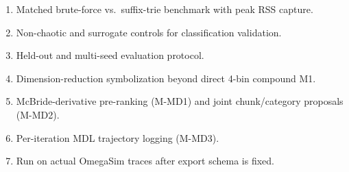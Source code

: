 \documentclass[11pt]{article}
\begin{document}
\begin{enumerate}
\item Matched brute-force vs.\ suffix-trie benchmark with peak RSS capture.
\item Non-chaotic and surrogate controls for classification validation.
\item Held-out and multi-seed evaluation protocol.
\item Dimension-reduction symbolization beyond direct 4-bin compound M1.
\item McBride-derivative pre-ranking (M-MD1) and joint chunk/category proposals (M-MD2).
\item Per-iteration MDL trajectory logging (M-MD3).
\item Run on actual OmegaSim traces after export schema is fixed.
\end{enumerate}
\end{document}
